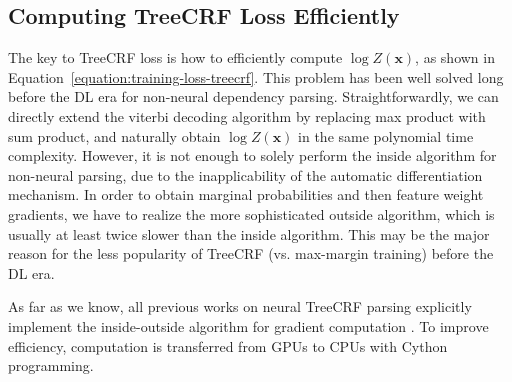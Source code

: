 


\subsection{Computing TreeCRF Loss Efficiently}


The key to TreeCRF loss is how to efficiently compute $\log Z(\boldsymbol{x})$,
as shown in Equation~\ref{equation:training-loss-treecrf}.
This problem has been well solved long before the DL era
for non-neural dependency parsing.
Straightforwardly, we can directly extend the viterbi decoding algorithm by replacing max product with sum product, and naturally obtain $\log Z(\boldsymbol{x})$ in the same polynomial time complexity.
However, it is not enough to solely perform the inside algorithm for non-neural parsing, due to the inapplicability of the automatic differentiation mechanism. %
In order to obtain marginal probabilities and then feature weight gradients, we have to realize the more sophisticated outside algorithm, which is usually at least twice slower than the inside algorithm.
This may be the major reason for the less popularity of TreeCRF (vs. max-margin training) before the DL era.



As far as we know, all previous works on neural TreeCRF parsing
explicitly implement the inside-outside algorithm for gradient computation \cite{zhang-etal-2019-empirical, jiang-etal-2018-supervised}.
To improve efficiency, computation is transferred from GPUs to CPUs with Cython programming.

